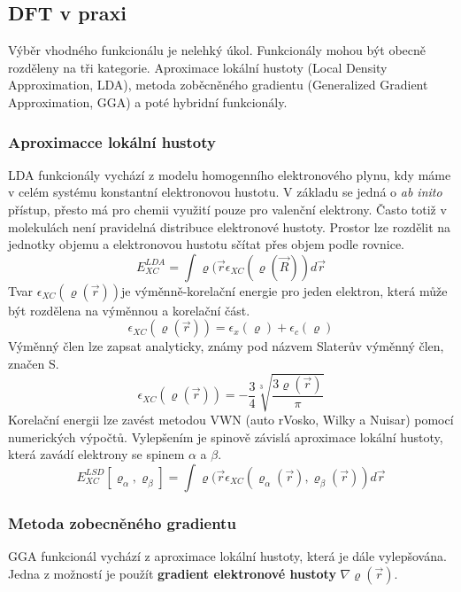 \documentclass[
  digital, %
  table,   %
  lof,     %
  lot,     %
]{fithesis3}
\begin{document}
\subsection{DFT v praxi}
Výběr vhodného funkcionálu je nelehký úkol. Funkcionály mohou být obecně rozděleny na tři kategorie. Aproximace lokální hustoty (Local Density Approximation, LDA), metoda zoběcněného gradientu (Generalized Gradient Approximation, GGA) a poté hybridní funkcionály. \cite{dftshrnutivysledky}
\subsubsection{Aproximacce lokální hustoty}
LDA funkcionály vychází z modelu homogenního elektronového plynu, kdy máme v celém systému konstantní elektronovou hustotu.\cite{dftshrnutivysledky} V základu se jedná o \textit{ab inito} přístup, přesto má pro chemii využití pouze pro valenční elektrony. Často totiž v molekulách není pravidelná distribuce elektronové hustoty. Prostor lze rozdělit na jednotky objemu a elektronovou hustotu sčítat přes objem podle rovnice.
\begin{equation}
E_{XC}^{LDA} = \int \varrho (\vec{r} \epsilon_{XC} (\varrho (\vec{R})) d \vec{r}
\label{LDA_vyraz_pro_obecnou_energii}
\end{equation}
Tvar $\epsilon_{XC}(\varrho (\vec{r}))$je výměnně-korelační energie pro jeden elektron, která může být rozdělena na výměnnou a korelační část. 
\begin{equation}
\epsilon_{XC}(\varrho (\vec{r})) = \epsilon_x (\varrho) + \epsilon_c (\varrho)
\label{LDA_tvar_vymene_korelacni_energie}
\end{equation}
Výměnný člen lze zapsat analyticky, známy pod názvem Slaterův výměnný člen, značen S.
\begin{equation}
\epsilon_{XC}(\varrho (\vec{r})) = - \frac{3}{4} \sqrt[3]{\frac{3 \varrho (\vec{r})}{\pi}}
\label{LDA_vymenny_clen}
\end{equation}
Korelační energii lze zavést metodou VWN (auto rVosko, Wilky a Nuisar) pomocí numerických výpočtů. Vylepšením je spinově závislá aproximace lokální hustoty, která zavádí elektrony se spinem $\alpha$ a $\beta$.
\begin{equation}
E_{XC}^{LSD}[\varrho_{\alpha}, \varrho_{\beta}] = \int \varrho (\vec{r} \epsilon_{XC}( \varrho_{\alpha}(\vec{r}), \varrho_{\beta}(\vec{r})) d \vec{r}
\end{equation}
\cite{koch2000chemist}
\subsubsection{Metoda zobecněného gradientu}
GGA funkcionál vychází z aproximace lokální hustoty, která je dále vylepšována. Jedna z možností je použít \textbf{gradient elektronové hustoty} $\nabla \varrho (\vec{r})$.  \cite{koch2000chemist}
\end{document}
